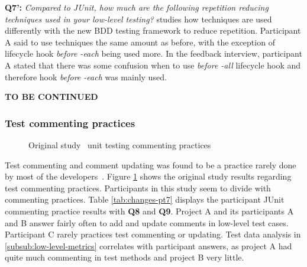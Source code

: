 \textbf{Q7':} \textit{Compared to JUnit, how much are the following repetition reducing techniques used in your low-level testing?}
studies how techniques are used differently with the new BDD testing framework to reduce repetition. Participant A
said to use techniques the same amount as before, with the exception of lifecycle hook \textit{before -each} being used more.
In the feedback interview, participant A stated that there was some confusion when to use \textit{before -all}
lifecycle hook and therefore hook \textit{before -each} was mainly used.

\textbf{TO BE CONTINUED}

\subsubsection{Test commenting practices}
    \begin{figure}[ht]%
        \centering
        \qquad
        \caption{Original study~\cite{li2016automatically} unit testing commenting practices}%
        \label{fig:org-commenting}%
    \end{figure}

Test commenting and comment updating was found to be a practice rarely done by most of the developers~\cite{li2016automatically}.
Figure \ref{fig:org-commenting} shows the original study results regarding test commenting practices. Participants in this
study seem to divide with commenting practices. Table \ref{tab:changes-pt7} displays the participant JUnit commenting practice results with
\textbf{Q8} and \textbf{Q9}. Project A and its participants A and B
answer fairly often to add and update comments in low-level test cases. Participant C rarely practices
test commenting or updating. Test data analysis in \ref{subsub:low-level-metrics} correlates with participant answers, as
project A had quite much commenting in test methods and project B very little.

